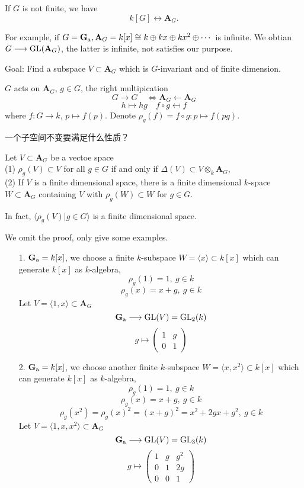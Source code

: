 If $G$ is not finite, we have 
\[k[G] \longleftrightarrow \mathbf{A}_G.\]

For example, if $G=\mathbf{G}_\mathrm{a}, \mathbf{A}_G=k[x]\cong k\oplus kx \oplus kx^2\oplus \cdots $ is infinite. We obtian $G\longrightarrow \operatorname {GL}(\mathbf{A}_G)$, the latter is infinite, not satisfies our purpose.

Goal: Find a subspace $V\subset \mathbf{A}_G$ which is $G$-invariant and of finite dimension.

$G$ acts on $\mathbf{A}_G$, $g\in G$, the right multipication
\[G\longrightarrow G \quad \Longleftrightarrow \mathbf{A}_G\longleftarrow \mathbf{A}_G\]
\[h\mapsto hg \quad f\circ g \mapsfrom f \]
where $f: G\longrightarrow k$, $p\mapsto f(p)$. Denote $\rho_g(f)=f\circ g \colon p\mapsto f(pg).$

一个子空间不变要满足什么性质？
\begin{lemma}
	Let $V\subset \mathbf{A}_G$ be a vectoe space\\
	(1) $\rho_g(V)\subset V$ for all $g\in G$ if and only if $\Delta(V) \subset V\otimes_k \mathbf{A}_G$,\\
	(2) If $V$ is a finite dimensional space, there is a finite dimensional $k$-space $W\subset \mathbf{A}_G$ containing $V$ with $\rho_g(W)\subset W$ for $g\in G$.

	In fact, $\langle \rho_g(V)| g\in G \rangle$ is a finite dimensional space.
\end{lemma}
We omit the proof, only give some examples.
\begin{example}
	\begin{itemize}
		\item[1.] $\mathbf{G}_\mathrm{a} =k[x]$, we choose a finite $k$-subspace $W=\langle x \rangle \subset k[x]$ which can generate $k[x]$ as $k$-algebra,
		\[\rho_g(1)=1, \ g\in k\]
		\[\rho_g(x)=x+g, \ g\in k\]
		Let $V=\langle 1,x \rangle \subset \mathbf{A}_G$  
		\[\mathbf{G}_\mathrm{a} \longrightarrow \operatorname {GL}(V)=\operatorname {GL}_2(k)\]
		\[g\mapsto \begin{pmatrix}1 &g \\0 &1\end{pmatrix}\]
		\item[2.] $\mathbf{G}_\mathrm{a} =k[x]$, we choose another finite $k$-subspace $W=\langle x,x^2 \rangle \subset k[x]$ which can generate $k[x]$ as $k$-algebra,
		\[\rho_g(1)=1, \ g\in k\]
		\[\rho_g(x)=x+g, \ g\in k\]
		\[\rho_g(x^2)=\rho_g(x)^2=(x+g)^2=x^2+2gx+g^2, \ g\in k\]
		Let $V=\langle 1,x,x^2 \rangle \subset \mathbf{A}_G$  
		\[\mathbf{G}_\mathrm{a} \longrightarrow \operatorname {GL}(V)=\operatorname {GL}_3(k)\]
		\[g\mapsto \begin{pmatrix}1 &g&g^2 \\0 &1 &2g \\0&0&1\end{pmatrix}\]
	\end{itemize}
\end{example}
